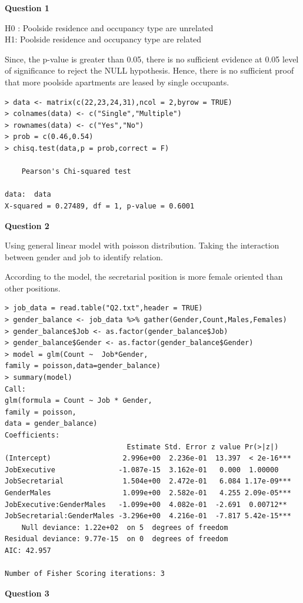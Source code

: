 \documentclass[12pt,letterpaper]{article}
\begin{document}
{\Large {\textbf{Question 1}}}

H0 : Poolside residence and occupancy type are unrelated \\
H1:  Poolside residence and occupancy type are related

Since, the p-value is greater than 0.05, there is no sufficient evidence at 0.05 level of significance to reject the NULL hypothesis.
Hence, there is no sufficient proof that more poolside apartments are leased by single occupants.

\begin{lstlisting}[label=R Code,caption=Q1 R Code Output]
> data <- matrix(c(22,23,24,31),ncol = 2,byrow = TRUE)
> colnames(data) <- c("Single","Multiple")
> rownames(data) <- c("Yes","No")
> prob = c(0.46,0.54)
> chisq.test(data,p = prob,correct = F)

	Pearson's Chi-squared test

data:  data
X-squared = 0.27489, df = 1, p-value = 0.6001
\end{lstlisting}


{\Large {\textbf{Question 2}}}

Using general linear model with poisson distribution. Taking the interaction between gender and job to identify relation. 

According to the model, the secretarial position is more female oriented than other positions. 

\begin{lstlisting}[label=R Code,caption=Q2 R Code Output]
> job_data = read.table("Q2.txt",header = TRUE)
> gender_balance <- job_data %>% gather(Gender,Count,Males,Females)
> gender_balance$Job <- as.factor(gender_balance$Job)
> gender_balance$Gender <- as.factor(gender_balance$Gender)
> model = glm(Count ~  Job*Gender,
family = poisson,data=gender_balance)
> summary(model)
Call:
glm(formula = Count ~ Job * Gender, 
family = poisson, 
data = gender_balance)
Coefficients:
                             Estimate Std. Error z value Pr(>|z|)    
(Intercept)                 2.996e+00  2.236e-01  13.397  < 2e-16***
JobExecutive               -1.087e-15  3.162e-01   0.000  1.00000    
JobSecretarial              1.504e+00  2.472e-01   6.084 1.17e-09***
GenderMales                 1.099e+00  2.582e-01   4.255 2.09e-05***
JobExecutive:GenderMales   -1.099e+00  4.082e-01  -2.691  0.00712** 
JobSecretarial:GenderMales -3.296e+00  4.216e-01  -7.817 5.42e-15***
    Null deviance: 1.22e+02  on 5  degrees of freedom
Residual deviance: 9.77e-15  on 0  degrees of freedom
AIC: 42.957

Number of Fisher Scoring iterations: 3
\end{lstlisting}
{\Large \textbf{Question 3}}
\end{document}

